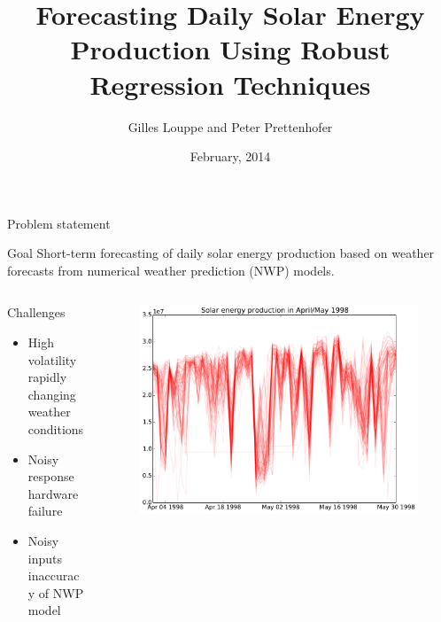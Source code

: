 \documentclass[handout]{beamer}
\title{Forecasting Daily Solar Energy Production Using Robust Regression Techniques}
\author{Gilles Louppe and Peter Prettenhofer}
\institute{Université de Liège, Belgium\\
Graz University of Technology, Austria}
\date{February, 2014}
\begin{document}

\begin{frame}
\titlepage
\end{frame}



\begin{frame}{Problem statement}
  \begin{block}{Goal}
      Short-term forecasting of daily solar energy production based on weather forecasts from numerical weather prediction (NWP) models.
  \end{block}


\begin{columns}[T]
\begin{column}{.45\textwidth}

  \begin{block}{Challenges}
      \begin{itemize}
         \item High volatility \\{\tiny rapidly changing weather conditions}

         \item Noisy response \\ {\tiny hardware failure}
         \item Noisy inputs \\ {\tiny inaccuracy of NWP model}
      \end{itemize}
  \end{block}

\end{column}
\begin{column}{.45\textwidth}
  \begin{figure}
    \includegraphics[width=\textwidth]{images/volatility.pdf}
  \end{figure}

\end{column}
\end{columns}
\end{frame}
\end{document}
